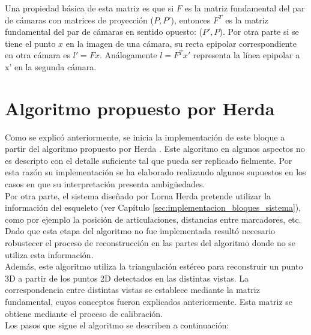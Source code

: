 Una propiedad básica de esta matriz es que si $F$ es la matriz fundamental del par de cámaras con matrices de proyección ($P,P'$), entonces $F^T$ es la matriz fundamental del par de cámaras en sentido opuesto: ($P',P$). Por otra parte si se tiene el punto $x$ en la imagen de una cámara, su recta epipolar correspondiente en otra cámara es $l'=Fx$. Análogamente $l=F^Tx'$ representa la línea epipolar a x' en la segunda cámara.

\section{Algoritmo propuesto por Herda }

Como se explicó anteriormente, se inicia la implementación de este bloque a partir del algoritmo propuesto por Herda \cite{herda}. Este algoritmo en algunos aspectos no es descripto con el detalle suficiente tal que pueda ser replicado fielmente. Por esta razón su implementación se ha elaborado realizando algunos supuestos en los casos en que su interpretación presenta ambigüedades.\\

Por otra parte, el sistema diseñado por Lorna Herda pretende utilizar la información del esqueleto (ver Capítulo \ref{sec:implementacion_bloques_sistema}), como por ejemplo la posición de articulaciones, distancias entre marcadores, etc. Dado que esta etapa del algoritmo no fue implementada resultó necesario robustecer el proceso de reconstrucción en las partes del algoritmo donde no se utiliza esta información.\\


Además, este algoritmo utiliza la triangulación estéreo para reconstruir un punto 3D a partir de los puntos 2D detectados en las distintas vistas. La correspondencia entre distintas vistas se establece mediante la matriz fundamental, cuyos conceptos fueron explicados anteriormente. Esta matriz se obtiene mediante el proceso de calibración.\\

Los pasos que sigue el algoritmo se describen a continuación:\

